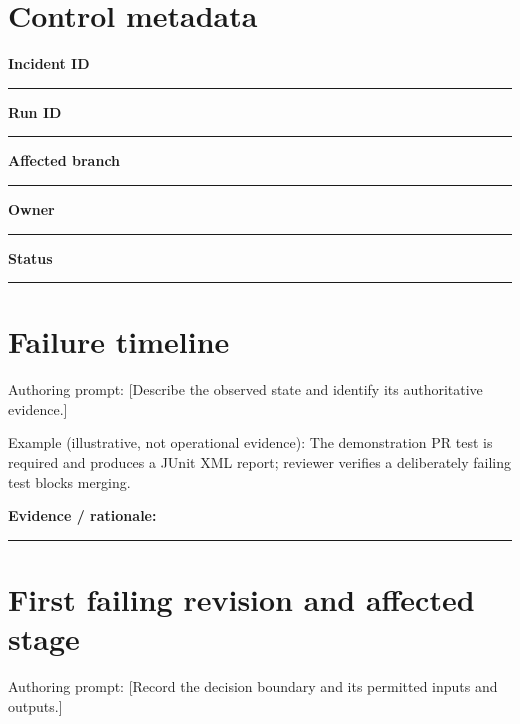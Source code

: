 \documentclass[11pt,letterpaper]{article}
\begin{document}
\makedoctitle\makedocsummary
\section{Control metadata}
\noindent\textbf{Incident ID}\par\nobreak\vspace{6pt}\noindent\rule{0.93\linewidth}{0.4pt}\par\vspace{14pt}
\noindent\textbf{Run ID}\par\nobreak\vspace{6pt}\noindent\rule{0.93\linewidth}{0.4pt}\par\vspace{14pt}
\noindent\textbf{Affected branch}\par\nobreak\vspace{6pt}\noindent\rule{0.93\linewidth}{0.4pt}\par\vspace{14pt}
\noindent\textbf{Owner}\par\nobreak\vspace{6pt}\noindent\rule{0.93\linewidth}{0.4pt}\par\vspace{14pt}
\noindent\textbf{Status}\par\nobreak\vspace{6pt}\noindent\rule{0.93\linewidth}{0.4pt}\par\vspace{14pt}
\section{Failure timeline}
Authoring prompt: [Describe the observed state and identify its authoritative evidence.]

Example (illustrative, not operational evidence): The demonstration PR test is required and produces a JUnit XML report; reviewer verifies a deliberately failing test blocks merging.

\noindent\textbf{Evidence / rationale:}\par\nobreak\vspace{8pt}\noindent\rule{0.93\linewidth}{0.4pt}\par\vspace{14pt}
\section{First failing revision and affected stage}
Authoring prompt: [Record the decision boundary and its permitted inputs and outputs.]
\end{document}
